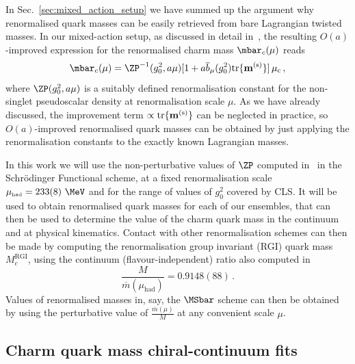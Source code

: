 %
In Sec.~\ref{sec:mixed_action_setup} we have summed up the argument why renormalised quark
masses can be easily retrieved from bare Lagrangian twisted masses.
%
In our mixed-action setup, as discussed in detail in~\cite{MA1}, the resulting $O(a)$-improved expression for the renormalised  charm mass $\mbar_c(\mu)$ reads
\begin{equation}
	\mbar_c(\mu) = 
	 \ZP^{-1}(g_0^2, a\mu) [1 + a\overline{b}_\mu(g_0^2) \rm{tr}\{\mathbf{m}^{(s)}\}]\,\mu_c\,,
	\label{eq:renormalised_charm_mass}
\end{equation}
where $\ZP(g_0^2, a\mu)$ is a suitably defined renormalisation constant for the non-singlet
pseudoscalar density at renormalisation scale $\mu$.
%
As we have already discussed, the improvement term $\propto\rm{tr}\{\mathbf{m}^{(s)}\}$
can be neglected in practice, so $O(a)$-improved renormalised quark masses can be obtained
by just applying the renormalisation constants to the exactly known Lagrangian masses.
%


%
In this work we will use the non-perturbative values of $\ZP$ computed in~\cite{Campos:2018ahf}
in the Schr\"odinger Functional scheme, at a fixed renormalisation scale
$\mu_{\rm\scriptscriptstyle had} = 233(8)~\MeV$ and for the range of values of $g_0^2$ covered
by CLS.
%
It will be used to obtain renormalised quark masses for each of our ensembles, that can then
be used to determine the value of the charm quark mass in the continuum and at physical kinematics.
%
Contact with other renormalisation schemes can then be made by computing the renormalisation
group invariant (RGI) quark mass $M_c^{\mathrm{RGI}}$, using the continuum (flavour-independent)
ratio also computed in~\cite{Campos:2018ahf}
\begin{equation}
	\frac{M}{\overline{m}(\mu_{\mathrm{had}})} = 0.9148(88)\,.
	\label{eq:rgi_running_factor}
\end{equation}
%
Values of renormalised masses in, say, the $\MSbar$ scheme can then be obtained by
using the perturbative value of $\frac{\overline{m}(\mu)}{M}$ at any convenient scale $\mu$.
%


\subsection{Charm quark mass chiral-continuum fits}
\label{subsec:mc_chiral_continuum}

